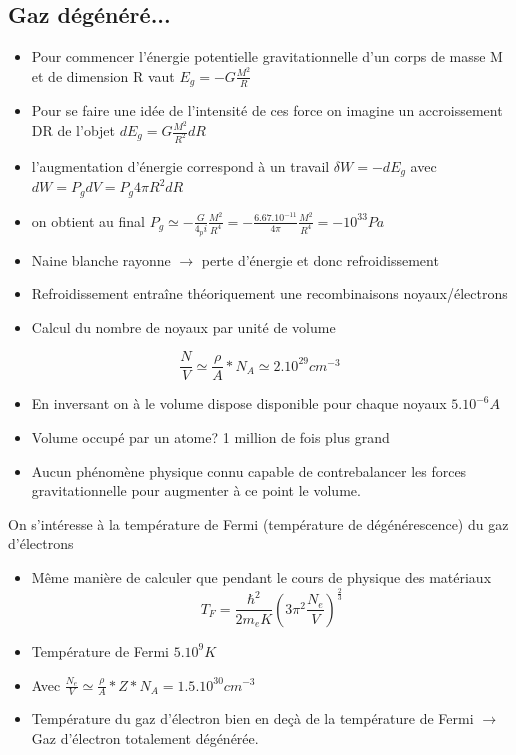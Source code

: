 \documentclass[11pt]{book} %
\begin{document}
\subsection{Gaz dégénéré...}

\begin{itemize}
  \item Pour commencer l'énergie potentielle gravitationnelle d'un corps de masse M et de dimension R vaut $E_g = -G \frac{M^2}{R}$
  \item Pour se faire une idée de l’intensité de ces force on imagine un accroissement DR de l'objet $dE_g = G \frac{M^2}{R^2}dR$
  \item l'augmentation d'énergie correspond à un travail $\delta W = -dE_g$ avec $dW  =P_gdV = P_g 4\pi R^2 dR$
  \item on obtient au final $P_g\simeq -\frac{G}{4_pi}\frac{M^2}{R^4} = -\frac{6.67.10^{-11}}{4\pi}\frac{M^2}{R^4} = \boxed{-10^{33} Pa}$
\end{itemize}
\n
\begin{itemize}
  \item Naine blanche rayonne $\rightarrow$ perte d'énergie et donc refroidissement
  \item Refroidissement entraîne théoriquement une recombinaisons noyaux/électrons
  \item Calcul du nombre de noyaux par unité de volume
\end{itemize}

$$\frac{N}{V}\simeq \frac{\rho}{A}*N_A \simeq 2.10^{29}cm^{-3}$$
\begin{itemize}
  \item En inversant on à le volume dispose disponible pour chaque noyaux $5.10^{-6}A$
  \item Volume occupé par un atome? 1 million de fois plus grand
  \item Aucun phénomène physique connu capable de contrebalancer les forces gravitationnelle pour augmenter à ce point le volume.
\end{itemize}
\n
On s’intéresse à la température de Fermi (température de dégénérescence) du gaz d'électrons
\begin{itemize}
  \item Même manière de calculer que pendant le cours de physique des matériaux
  $$T_F = \frac{\hbar^2}{2m_e K}\left(3\pi^2 \frac{N_e}{V}\right)^{\frac{2}{3}}$$
  \item Température de Fermi $\boxed{5.10^9 K}$
  \item Avec $\frac{N_e}{V}\simeq \frac{\rho}{A}*Z*N_A = 1.5.10^{30}cm^{-3}$
  \item Température du gaz d'électron bien en deçà de la température de Fermi $\rightarrow$ Gaz d'électron totalement dégénérée.
\end{itemize}
\n
\end{document}
